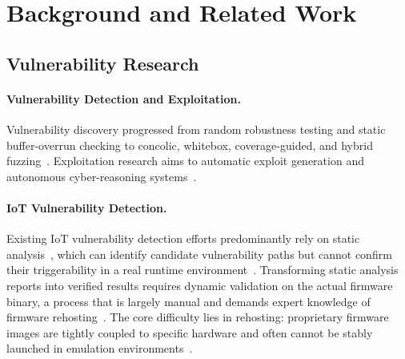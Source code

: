 \section{Background and Related Work}
\label{sec:background}


    

\subsection{Vulnerability Research}

\paragraph{Vulnerability Detection and Exploitation.}
Vulnerability discovery progressed from random robustness testing and static buffer-overrun checking to concolic, whitebox, coverage-guided, and hybrid fuzzing~\cite{fuzz,wagner2000boon,godefroid2005dart,godefroid2008sage,bohme2016aflfast,stephens2016driller,qsym}. 
Exploitation research 
aims to automatic exploit generation and autonomous cyber-reasoning systems~\cite{alephone1996stack,shacham2007rop,brumley2008patchaeg,avgerinos2011aeg,cha2012mayhem,mechanicalphish}. 

\paragraph{IoT Vulnerability Detection.}
Existing IoT vulnerability detection efforts predominantly rely on static analysis~\cite{karonte,satc,emtaint,hermescan,mango,nvwa}, which can identify candidate vulnerability paths but cannot confirm their triggerability in a real runtime environment~\cite{challenges}. Transforming static analysis reports into verified results requires dynamic validation on the actual firmware binary, a process that is largely manual and demands expert knowledge of firmware rehosting~\cite{firmadyne,firmae,greenhouse,pandawan}. The core difficulty lies in rehosting: proprietary firmware images are tightly coupled to specific hardware and often cannot be stably launched in emulation environments~\cite{fuzzware,firmafl}.

